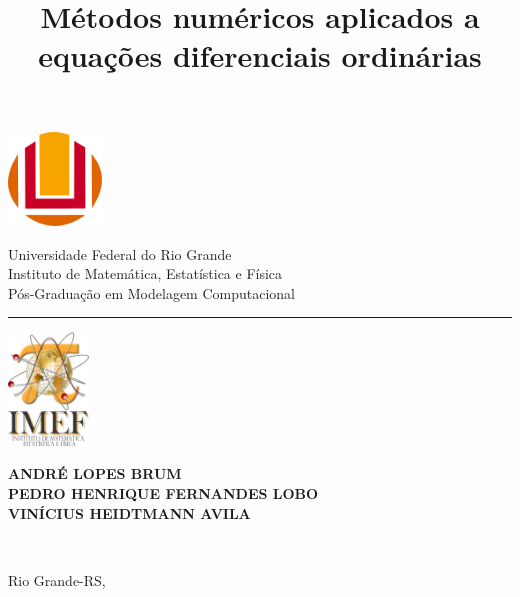 \documentclass[
		12pt,            %
		a4paper
	      ]  
	      {article}          %
\title{Métodos numéricos aplicados a equações diferenciais ordinárias}
\newcommand{\authorA}{André Lopes Brum}
\newcommand{\authorB}{Pedro Henrique Fernandes Lobo}
\newcommand{\authorC}{Vinícius Heidtmann Avila}
\begin{document}
	\begin{titlepage}
	\makeatletter

	\noindent%
		\includegraphics[height=25.0mm]{logoFurg.png}
		\begin{minipage}[b]{0.7\textwidth}
			\centering
			{\Large Universidade Federal do Rio Grande} \\
			\vspace{1.5mm}
			{Instituto de Matemática, Estatística e Física} \\
			\vspace{0.5mm}
			{\sc Pós-Graduação em Modelagem Computacional} \\
			\vspace{0.2mm}
			\centering\rule{0.95\textwidth}{1pt}
		\end{minipage}
		\includegraphics[height=30.0mm, clip, trim = 10mm  0 0 0]{logoIMEF.jpg}
		\begin{center}	
			{\bf\small \MakeUppercase{\authorA}}\\		 
			{\bf\small \MakeUppercase{\authorB}}\\		 
			{\bf\small \MakeUppercase{\authorC}}\\
		\end{center}
			\vspace{5cm}
		\begin{center}
			{\bf\large \MakeUppercase{\@title}} \\
		\end{center}
		\vfill		
		\begin{center}
			\vspace{15mm}
			Rio Grande-RS, \the\year 
		\end{center}

	\makeatother
	\end{titlepage}


\end{document}
